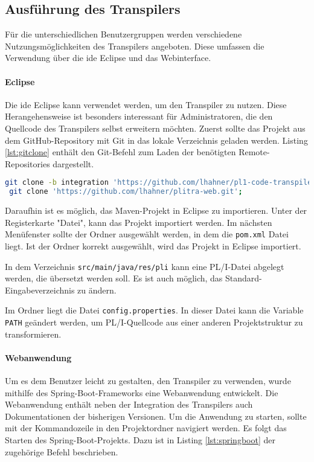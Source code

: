 \subsection{Ausführung des Transpilers}

Für die unterschiedlichen Benutzergruppen werden verschiedene Nutzungsmöglichkeiten des Transpilers angeboten. Diese umfassen die Verwendung über die \ac{ide} Eclipse und das Webinterface.

\paragraph*{Eclipse}
Die \ac{ide} Eclipse kann verwendet werden, um den Transpiler zu nutzen. Diese Herangehensweise ist besonders interessant für Administratoren, die den Quellcode des Transpilers selbst erweitern möchten.
Zuerst sollte das Projekt aus dem GitHub-Repository mit Git in das lokale Verzeichnis geladen werden.
Listing \ref{lst:gitclone} enthält den Git-Befehl zum Laden der benötigten Remote-Repositories dargestellt. 

\begin{lstlisting}[language=bash, caption=Klonen der Transpiler Repositories, label={lst:gitclone}, basicstyle=\fontsize{9}{13}\selectfont\ttfamily]
 git clone -b integration 'https://github.com/lhahner/pl1-code-transpiler.git'; 
 git clone 'https://github.com/lhahner/plitra-web.git';
\end{lstlisting}

Daraufhin ist es möglich, das Maven-Projekt in Eclipse zu importieren. Unter der Registerkarte "Datei", kann das Projekt importiert werden. Im nächsten Menüfenster sollte der Ordner ausgewählt werden, in dem die \verb+pom.xml+ Datei liegt. Ist der Ordner korrekt ausgewählt, wird das Projekt in Eclipse importiert. 

In dem Verzeichnis \verb+src/main/java/res/pli+ kann eine PL/I-Datei abgelegt werden, die übersetzt werden soll. Es ist auch möglich, das Standard-Eingabeverzeichnis zu ändern. 

Im Ordner  liegt die Datei \verb+config.properties+. 
In dieser Datei kann die Variable \verb+PATH+ geändert werden, 
um PL/I-Quellcode aus einer anderen Projektstruktur zu transformieren.

\paragraph*{Webanwendung}
Um es dem Benutzer leicht zu gestalten, den Transpiler zu verwenden, wurde mithilfe des Spring-Boot-Frameworks eine Webanwendung entwickelt.
Die Webanwendung enthält neben der Integration des Transpilers auch Dokumentationen der bisherigen Versionen.
Um die Anwendung zu starten, sollte mit der Kommandozeile in den Projektordner navigiert werden.
Es folgt das Starten des Spring-Boot-Projekts. Dazu ist in Listing \ref{lst:springboot} der zugehörige Befehl beschrieben.

